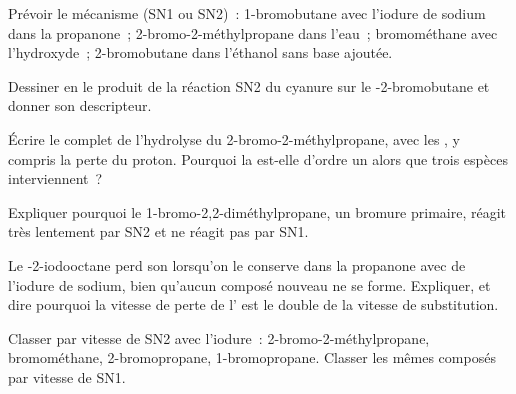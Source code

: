 \begin{exercise}[$\star$]\label{exo:b1:nucleophilic-substitution:3}
Prévoir le mécanisme (SN1 ou SN2)~: 1-bromobutane avec l'iodure de
sodium dans la propanone~; 2-bromo-2-méthylpropane dans l'eau~;
bromométhane avec l'hydroxyde~; 2-bromobutane dans l'éthanol sans base
ajoutée.
\end{exercise}

\begin{exercise}[$\star$]\label{exo:b1:nucleophilic-substitution:4}
Dessiner en  le produit de la réaction SN2 du
cyanure sur le -2-bromobutane et donner son descripteur.
\end{exercise}

\begin{exercise}[$\star\star$]\label{exo:b1:nucleophilic-substitution:5}
Écrire le  complet de l'hydrolyse du
2-bromo-2-méthylpropane, avec les , y compris la perte du
proton. Pourquoi la  est-elle d'ordre un alors que trois
espèces interviennent~?
\end{exercise}

\begin{exercise}[$\star\star$]\label{exo:b1:nucleophilic-substitution:6}
Expliquer pourquoi le 1-bromo-2,2-diméthylpropane, un bromure primaire,
réagit très lentement par SN2 et ne réagit pas par SN1.
\end{exercise}

\begin{exercise}[$\star\star$]\label{exo:b1:nucleophilic-substitution:7}
Le -2-iodooctane perd son  lorsqu'on le conserve
dans la propanone avec de l'iodure de sodium, bien qu'aucun composé
nouveau ne se forme. Expliquer, et dire pourquoi la vitesse de perte de
l' est le double de la vitesse de substitution.
\end{exercise}

\begin{exercise}[$\star\star$]\label{exo:b1:nucleophilic-substitution:8}
Classer par vitesse de SN2 avec l'iodure~: 2-bromo-2-méthylpropane,
bromométhane, 2-bromopropane, 1-bromopropane. Classer les mêmes composés
par vitesse de  SN1.
\end{exercise}

